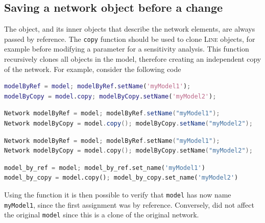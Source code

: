 \subsection{Saving a network object before a change}
The  object, and its inner objects that describe the network elements, are always passed by reference. The \texttt{copy} function should be used to clone \textsc{Line} objects, for example before modifying a parameter for a sensitivity analysis. This function recursively clones all objects in the model, therefore creating an independent copy of the network. For example, consider the following code
\begin{MATLAB}
\begin{lstlisting}[language = matlab]
modelByRef = model; modelByRef.setName('myModel1');
modelByCopy = model.copy; modelByCopy.setName('myModel2');
\end{lstlisting}
\end{MATLAB}
\begin{JAVA}
\begin{lstlisting}[language=java, basicstyle=\ttfamily\scriptsize]
Network modelByRef = model; modelByRef.setName("myModel1");
Network modelByCopy = model.copy(); modelByCopy.setName("myModel2");
\end{lstlisting}
\end{JAVA}
\begin{KOTLIN}
\begin{lstlisting}[language=kotlin, basicstyle=\ttfamily\scriptsize]
Network modelByRef = model; modelByRef.setName("myModel1");
Network modelByCopy = model.copy(); modelByCopy.setName("myModel2");
\end{lstlisting}
\end{KOTLIN}
\begin{PYTHON}
\begin{lstlisting}[language=python]
model_by_ref = model; model_by_ref.set_name('myModel1')
model_by_copy = model.copy(); model_by_copy.set_name('myModel2')
\end{lstlisting}
\end{PYTHON}
Using the  function it is then possible to verify that \texttt{model} has now name \texttt{myModel1}, since the first assignment was by reference. Conversely,  did not affect the original \texttt{model} since this is a clone of the original network.

